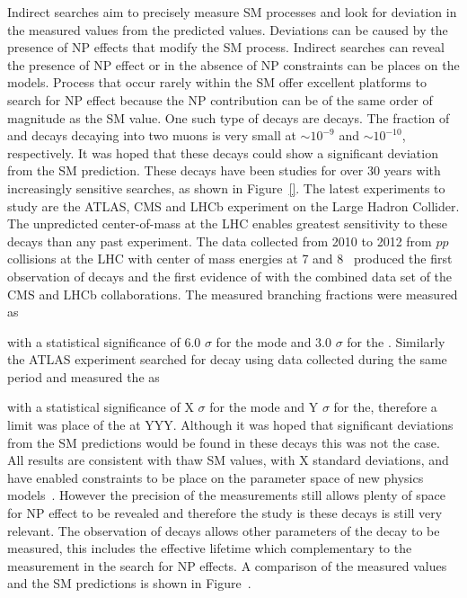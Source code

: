 Indirect searches aim to precisely measure SM processes and look for deviation in the measured values from the predicted values. Deviations can be caused by the presence of NP effects that modify the SM process. Indirect searches can reveal the presence of NP effect or in the absence of NP constraints can be places on the models.
Process that occur rarely within the SM offer excellent platforms to search for NP effect because the NP contribution can be of the same order of magnitude as the SM value. %
One such type of decays are \bmumu decays. The fraction of \bs and \bd decays decaying into two muons is very small at $\sim 10^{-9}$ and $\sim 10^{-10}$, respectively. It was hoped that these decays could show a significant deviation from the SM prediction. These decays have been studies for over 30 years with increasingly sensitive searches, as shown in Figure~\ref{}. The latest experiments to study are the ATLAS, CMS and LHCb experiment on the Large Hadron Collider. The unpredicted center-of-mass at the LHC enables greatest sensitivity to these decays than any past experiment.  
The data collected from 2010 to 2012 from $pp$ collisions at the LHC with center of mass energies at 7 and 8~\tev
 produced the first observation of \bsmumu decays and the first evidence of \bdmumu with the combined data set of the CMS and LHCb collaborations. The measured branching fractions were measured as


with a statistical significance of 6.0 $\sigma$ for the \bs mode and 3.0 $\sigma$ for the \bd. Similarly the ATLAS experiment searched for \bmumu decay using data collected during the same period and measured the \BF as

with a statistical significance of X $\sigma$ for the \bs mode and Y $\sigma$ for the\bd, therefore a limit was place of the \bd \BF at YYY. Although it was hoped that significant deviations from the SM predictions would be found in these decays this was not the case. All results are consistent with thaw SM values, with X standard deviations, and have enabled constraints to be place on the parameter space of new physics models~\cite{}. However the precision of the measurements still allows plenty of space for NP effect to be revealed and therefore the study is these decays is still very relevant. The observation of \bsmumu decays allows other parameters of the decay to be measured, this includes the effective lifetime which complementary to the \BF measurement in the search for NP effects. A comparison of the measured \BF values and the SM predictions is shown in Figure~\cite{}.

